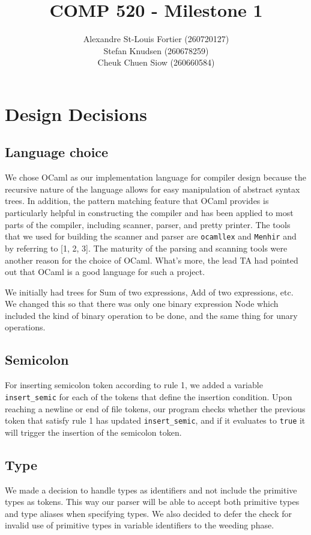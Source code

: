 \documentclass{article}
\begin{document}
\pagestyle{empty}

\title{COMP 520 - Milestone 1}
\author{
Alexandre St-Louis Fortier (260720127)\\
Stefan Knudsen (260678259)\\
Cheuk Chuen Siow (260660584)}
\maketitle

\raggedright
\section*{Design Decisions}
\subsection*{Language choice}
We chose OCaml as our implementation language for compiler design because the recursive nature of the language allows for easy manipulation of abstract syntax trees. In addition, the pattern matching feature that OCaml provides is particularly helpful in constructing the compiler and has been applied to most parts of the compiler, including scanner, parser, and pretty printer. The tools that we used for building the scanner and parser are \verb|ocamllex| and \verb|Menhir| and by referring to [1, 2, 3]. The maturity of the parsing and scanning tools were another reason for the choice of OCaml. What's more, the lead TA had pointed out that OCaml is a good language for such a project. 

We initially had trees for Sum of two expressions, Add of two expressions, etc. We changed this so that there was only one binary expression Node which included the kind of binary operation to be done, and the same thing for unary operations.

\subsection*{Semicolon}
For inserting semicolon token according to rule 1, we added a variable \verb|insert_semic| for each of the tokens that define the insertion condition. Upon reaching a newline or end of file tokens, our program checks whether the previous token that satisfy rule 1 has updated \verb|insert_semic|, and if it evaluates to \verb|true| it will trigger the insertion of the semicolon token.

\subsection*{Type}
We made a decision to handle types as identifiers and not include the primitive types as tokens. This way our parser will be able to accept both primitive types and type aliases when specifying types. We also decided to defer the check for invalid use of primitive types in variable identifiers to the weeding phase.
\end{document}
